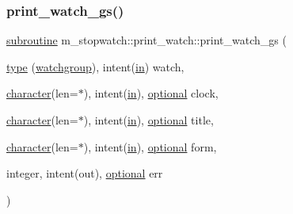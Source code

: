 \subsubsection{\texorpdfstring{print\+\_\+watch\+\_\+gs()}{print\_watch\_gs()}}
{\footnotesize\ttfamily \hyperlink{M__stopwatch_83_8txt_acfbcff50169d691ff02d4a123ed70482}{subroutine} m\+\_\+stopwatch\+::print\+\_\+watch\+::print\+\_\+watch\+\_\+gs (\begin{DoxyParamCaption}\item[{\hyperlink{stop__watch_83_8txt_a70f0ead91c32e25323c03265aa302c1c}{type} (\hyperlink{structm__stopwatch_1_1watchgroup}{watchgroup}), intent(\hyperlink{M__journal_83_8txt_afce72651d1eed785a2132bee863b2f38}{in})}]{watch,  }\item[{\hyperlink{option__stopwatch_83_8txt_abd4b21fbbd175834027b5224bfe97e66}{character}(len=$\ast$), intent(\hyperlink{M__journal_83_8txt_afce72651d1eed785a2132bee863b2f38}{in}), \hyperlink{option__stopwatch_83_8txt_aa4ece75e7acf58a4843f70fe18c3ade5}{optional}}]{clock,  }\item[{\hyperlink{option__stopwatch_83_8txt_abd4b21fbbd175834027b5224bfe97e66}{character}(len=$\ast$), intent(\hyperlink{M__journal_83_8txt_afce72651d1eed785a2132bee863b2f38}{in}), \hyperlink{option__stopwatch_83_8txt_aa4ece75e7acf58a4843f70fe18c3ade5}{optional}}]{title,  }\item[{\hyperlink{option__stopwatch_83_8txt_abd4b21fbbd175834027b5224bfe97e66}{character}(len=$\ast$), intent(\hyperlink{M__journal_83_8txt_afce72651d1eed785a2132bee863b2f38}{in}), \hyperlink{option__stopwatch_83_8txt_aa4ece75e7acf58a4843f70fe18c3ade5}{optional}}]{form,  }\item[{integer, intent(out), \hyperlink{option__stopwatch_83_8txt_aa4ece75e7acf58a4843f70fe18c3ade5}{optional}}]{err }\end{DoxyParamCaption})\hspace{0.3cm}{\ttfamily [private]}}

\mbox{\label{interfacem__stopwatch_1_1print__watch_a767e289ec49cc206118c1d0990af55b9}} 
